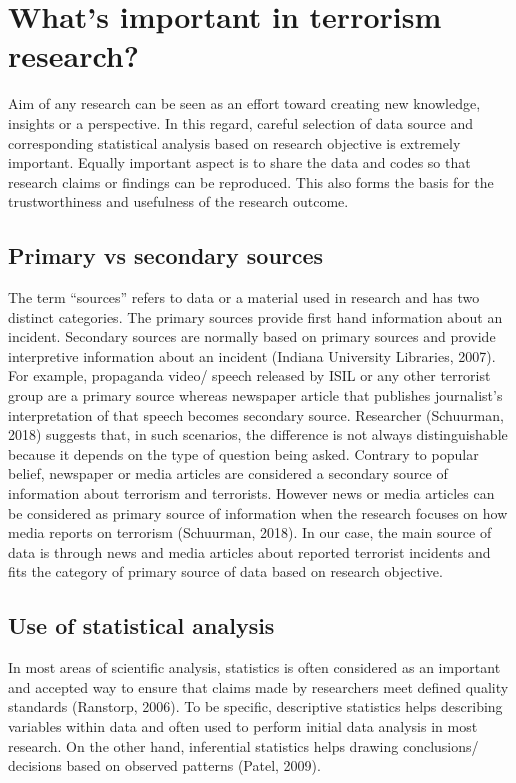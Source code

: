 \documentclass[11pt,oneside,a4paper]{reedthesis}
\begin{document}
\section{What's important in terrorism
research?}\label{whats-important-in-terrorism-research}

Aim of any research can be seen as an effort toward creating new
knowledge, insights or a perspective. In this regard, careful selection
of data source and corresponding statistical analysis based on research
objective is extremely important. Equally important aspect is to share
the data and codes so that research claims or findings can be
reproduced. This also forms the basis for the trustworthiness and
usefulness of the research outcome.

\subsection{Primary vs secondary
sources}\label{primary-vs-secondary-sources}

The term ``sources'' refers to data or a material used in research and
has two distinct categories. The primary sources provide first hand
information about an incident. Secondary sources are normally based on
primary sources and provide interpretive information about an incident
(Indiana University Libraries, 2007). For example, propaganda video/
speech released by ISIL or any other terrorist group are a primary
source whereas newspaper article that publishes journalist's
interpretation of that speech becomes secondary source. Researcher
(Schuurman, 2018) suggests that, in such scenarios, the difference is
not always distinguishable because it depends on the type of question
being asked. Contrary to popular belief, newspaper or media articles are
considered a secondary source of information about terrorism and
terrorists. However news or media articles can be considered as primary
source of information when the research focuses on how media reports on
terrorism (Schuurman, 2018). In our case, the main source of data is
through news and media articles about reported terrorist incidents and
fits the category of primary source of data based on research objective.

\subsection{Use of statistical
analysis}\label{use-of-statistical-analysis}

In most areas of scientific analysis, statistics is often considered as
an important and accepted way to ensure that claims made by researchers
meet defined quality standards (Ranstorp, 2006). To be specific,
descriptive statistics helps describing variables within data and often
used to perform initial data analysis in most research. On the other
hand, inferential statistics helps drawing conclusions/ decisions based
on observed patterns (Patel, 2009).
\end{document}
